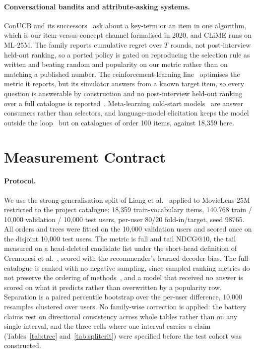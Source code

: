 \documentclass[runningheads]{llncs}
\begin{document}
\paragraph{Conversational bandits and attribute-asking systems.}
ConUCB and its successors~\cite{zhang2020conucb,wang2023conlinucb,liu2025clisk} ask about a key-term
or an item in one algorithm, which is our item-versus-concept channel formalised in 2020, and CLiME
runs on ML-25M. The family reports cumulative regret over $T$ rounds, not post-interview held-out ranking, so a
ported policy is gated on reproducing the selection rule as written and beating random and popularity
on our metric rather than on matching a published number. The
reinforcement-learning
line~\cite{sun2018conversational,lei2020estimation,lei2020interactive,deng2021unicorn,li2021seamlessly}
optimises the metric it reports, but its simulator answers from a known target item, so every
question is answerable by construction and no post-interview held-out ranking over a full catalogue
is reported~\cite{kim2024targetfree,zhang2022minicorn}. Meta-learning cold-start
models~\cite{lee2019melu,lin2021tanp} are answer consumers rather than selectors, and language-model
elicitation keeps the model outside the loop~\cite{austin2024bayesian} but on catalogues of order 100
items, against 18{,}359 here.

\section{Measurement Contract}
\label{sec:contract}

\paragraph{Protocol.}
We use the strong-generalisation split of Liang et al.~\cite{liang2018variational} applied to
MovieLens-25M~\cite{harper2015movielens} restricted to the project catalogue: 18{,}359
train-vocabulary items, 140{,}768 train / 10{,}000 validation / 10{,}000 test users, per-user 80/20
fold-in/target, seed 98765. All orders and trees were fitted on the 10{,}000 validation users and
scored once on the disjoint 10{,}000 test users. The metric is full and tail NDCG@10, the tail
measured on a head-deleted candidate list under the short-head definition of Cremonesi et
al.~\cite{cremonesi2010performance}, scored with the recommender's learned decoder bias. The full
catalogue is ranked with no negative sampling, since sampled ranking metrics do not preserve the
ordering of methods~\cite{krichene2020sampled}, and a model that received no answer is scored on what
it predicts rather than overwritten by a popularity row. Separation is a paired percentile bootstrap
over the per-user difference, 10{,}000 resamples clustered over users. No family-wise correction is
applied: the battery claims rest on directional consistency across whole tables rather than on any
single interval, and the three cells where one interval carries a claim (Tables~\ref{tab:tree}
and~\ref{tab:splitcrit}) were specified before the test cohort was constructed.
\end{document}
